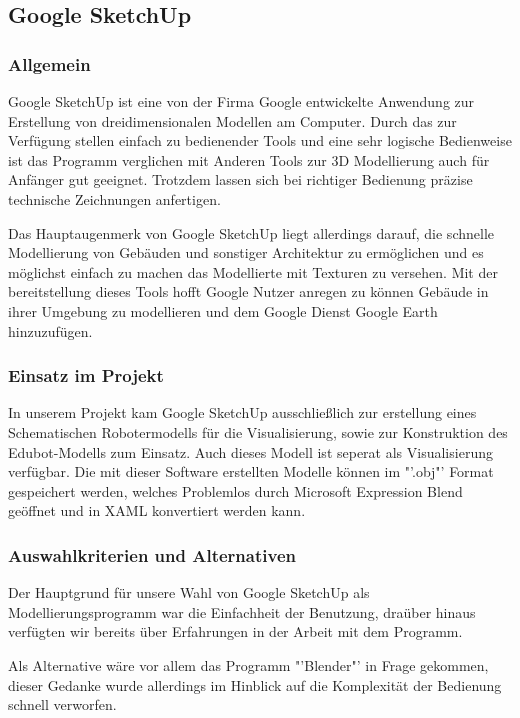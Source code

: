 \subsection{Google SketchUp}
\subsubsection{Allgemein}
Google SketchUp ist eine von der Firma Google entwickelte Anwendung zur Erstellung von dreidimensionalen Modellen am Computer. Durch das zur Verfügung stellen einfach zu bedienender Tools und eine sehr logische Bedienweise ist das Programm verglichen mit Anderen Tools zur 3D Modellierung auch für Anfänger gut geeignet. Trotzdem lassen sich bei richtiger Bedienung präzise technische Zeichnungen anfertigen.

Das Hauptaugenmerk von Google SketchUp liegt allerdings darauf, die schnelle Modellierung von Gebäuden und sonstiger Architektur zu ermöglichen und es möglichst einfach zu machen das Modellierte mit Texturen zu versehen. Mit der bereitstellung dieses Tools hofft Google Nutzer anregen zu können Gebäude in ihrer Umgebung zu modellieren und dem Google Dienst Google Earth hinzuzufügen.

\subsubsection{Einsatz im Projekt}
In unserem Projekt kam Google SketchUp ausschließlich zur erstellung eines Schematischen Robotermodells für die Visualisierung, sowie zur Konstruktion des Edubot-Modells zum Einsatz. Auch dieses Modell ist seperat als Visualisierung verfügbar. 
Die mit dieser Software erstellten Modelle können im "'.obj"' Format gespeichert werden, welches Problemlos durch Microsoft Expression Blend geöffnet und in XAML konvertiert werden kann. 

\subsubsection{Auswahlkriterien und Alternativen}
Der Hauptgrund für unsere Wahl von Google SketchUp als Modellierungsprogramm war die Einfachheit der Benutzung, draüber hinaus verfügten wir bereits über Erfahrungen in der Arbeit mit dem Programm.

Als Alternative wäre vor allem das Programm "'Blender"' in Frage gekommen, dieser Gedanke wurde allerdings im Hinblick auf die Komplexität der Bedienung schnell verworfen.
 